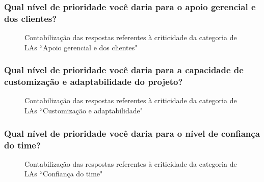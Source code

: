 \subsubsection{Qual nível de prioridade você daria para o apoio gerencial e dos clientes?}

\begin{figure}[H]
	\centering
	\captionsetup{justification=centering}
	\caption{Contabilização das respostas referentes à criticidade da categoria de LAs ``Apoio gerencial e dos clientes"}
	\label{fig:result-apoio}
\end{figure}

\subsubsection{Qual nível de prioridade você daria para a capacidade de customização e adaptabilidade do projeto?}

\begin{figure}[H]
	\centering
	\captionsetup{justification=centering}
	\caption{Contabilização das respostas referentes à criticidade da categoria de LAs ``Customização e adaptabilidade"}
	\label{fig:result-adaptabilidade}
\end{figure}

\subsubsection{Qual nível de prioridade você daria para o nível de confiança do time?}

\begin{figure}[H]
	\centering
	\captionsetup{justification=centering}
	\caption{Contabilização das respostas referentes à criticidade da categoria de LAs ``Confiança do time"}
	\label{fig:result-confianca}
\end{figure}

